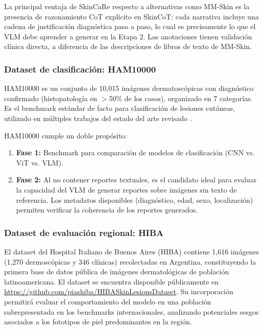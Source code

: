 \documentclass[11pt, a4paper]{article}
\begin{document}
La principal ventaja de SkinCaRe respecto a alternativas como MM-Skin es la presencia de razonamiento CoT explícito en SkinCoT: cada narrativa incluye una cadena de justificación diagnóstica paso a paso, lo cual es precisamente lo que el VLM debe aprender a generar en la Etapa 2. Las anotaciones tienen validación clínica directa, a diferencia de las descripciones de libros de texto de MM-Skin.

\subsubsection{Dataset de clasificación: HAM10000}

HAM10000 \cite{tschandl_ham10000_2018} es un conjunto de 10,015 imágenes dermatoscópicas con diagnóstico confirmado (histopatología en $>$50\% de los casos), organizado en 7 categorías. Es el benchmark estándar de facto para clasificación de lesiones cutáneas, utilizado en múltiples trabajos del estado del arte revisado \cite{aboulmira_skinhealthmate_2024, kang_skinr1_2025, khan_ensemble_2025}.

HAM10000 cumple un doble propósito:
\begin{enumerate}
    \item \textbf{Fase 1:} Benchmark para comparación de modelos de clasificación (CNN vs. ViT vs. VLM).
    \item \textbf{Fase 2:} Al no contener reportes textuales, es el candidato ideal para evaluar la capacidad del VLM de generar reportes sobre imágenes sin texto de referencia. Los metadatos disponibles (diagnóstico, edad, sexo, localización) permiten verificar la coherencia de los reportes generados.
\end{enumerate}

\subsubsection{Dataset de evaluación regional: HIBA}

El dataset del Hospital Italiano de Buenos Aires (HIBA) \cite{piashiba_hiba_2023} contiene 1,616 imágenes (1,270 dermoscópicas y 346 clínicas) recolectadas en Argentina, constituyendo la primera base de datos pública de imágenes dermatológicas de población latinoamericana. El dataset se encuentra disponible públicamente en \url{https://github.com/piashiba/HIBASkinLesionsDataset}. Su incorporación permitirá evaluar el comportamiento del modelo en una población subrepresentada en los benchmarks internacionales, analizando potenciales sesgos asociados a los fototipos de piel predominantes en la región.
\end{document}
